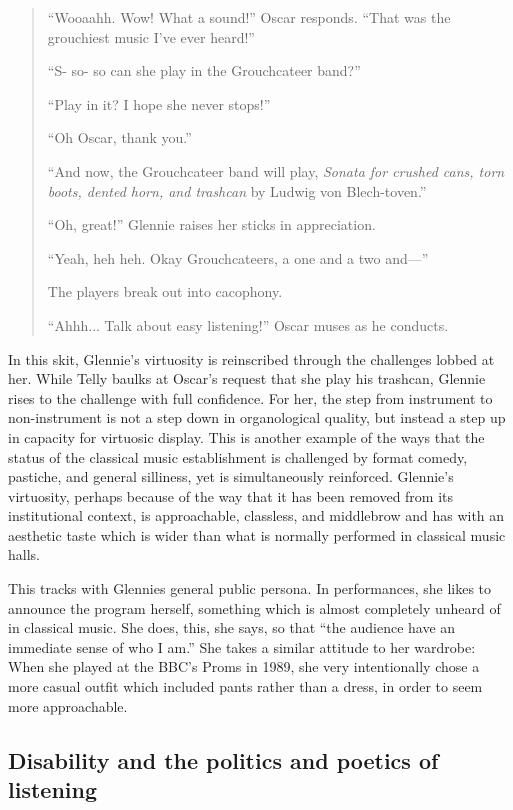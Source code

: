 \documentclass[12pt,letterpaper]{article}
\begin{document}
\begin{quote}
	``Wooaahh. Wow! What a sound!'' Oscar responds. ``That was the 
	grouchiest music I've ever heard!''

	``S- so- so can she play in the Grouchcateer band?''

	``Play in it? I hope she never stops!''

	``Oh Oscar, thank you.''

	``And now, the Grouchcateer band will play, \textit{Sonata for crushed 
	cans, torn boots, dented horn, and trashcan} by Ludwig von 
	Blech-toven.''

	``Oh, great!'' Glennie raises her sticks in appreciation.  

	``Yeah, heh heh. Okay Grouchcateers, a one and a two and---''

	The players break out into cacophony. 

	``Ahhh... Talk about easy listening!'' Oscar muses as he conducts. 

	\end{quote}

	In this skit, Glennie's virtuosity is reinscribed through the challenges
	lobbed at her. 
	While Telly baulks at Oscar's request that she play his trashcan,
	Glennie rises to 
	the challenge with full confidence. For her, the step from instrument to
	non-instrument is not a step down in organological quality, but instead
	a step up in capacity for virtuosic display. This is another example of 	the ways that the status of the classical music establishment is 
	challenged by format comedy, pastiche, and general silliness, yet is
	simultaneously reinforced. Glennie's virtuosity, perhaps because of the
	way that it has been removed from its institutional context, is  
	approachable, classless, and middlebrow and has with an aesthetic 
	taste which is wider than what is normally performed in classical
	music halls.  

	This tracks with Glennies general public persona. In performances, she 
	likes to announce the program herself, something which is almost
	completely unheard of in classical music. She does, this, she says, so 
	that ``the audience have an immediate sense of who I 
	am.''\autocite[3]{Glennie} She takes a similar attitude to her wardrobe:
	When she played at the BBC's Proms in 1989, she very intentionally chose
	a more casual outfit which included pants rather than a dress, in order
	to seem more approachable.  

	\subsection*{Disability and the politics and poetics of listening}	
\end{document}
